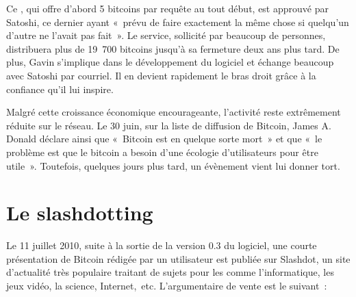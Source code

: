 Ce , qui offre d'abord 5 bitcoins par requête au tout début, est approuvé par Satoshi, ce dernier ayant «~prévu de faire exactement la même chose si quelqu'un d'autre ne l'avait pas fait~». Le service, sollicité par beaucoup de personnes, distribuera plus de 19~700 bitcoins jusqu'à sa fermeture deux ans plus tard. %
De plus, Gavin s'implique dans le développement du logiciel et échange beaucoup avec Satoshi par courriel. Il en devient rapidement le bras droit grâce à la confiance qu'il lui inspire.

Malgré cette croissance économique encourageante, l'activité reste extrêmement réduite sur le réseau. Le 30 juin, sur la liste de diffusion de Bitcoin, James A. Donald déclare ainsi que «~Bitcoin est en quelque sorte mort~» et que «~le problème est que le bitcoin a besoin d'une écologie d'utilisateurs pour être utile~». Toutefois, quelques jours plus tard, un évènement vient lui donner tort.

\section*{Le slashdotting}

Le 11 juillet 2010, suite à la sortie de la version 0.3 du logiciel, une courte présentation de Bitcoin rédigée par un utilisateur est publiée sur Slashdot, un site d'actualité très populaire traitant de sujets pour les  comme l'informatique, les jeux vidéo, la science, Internet,~etc. L'argumentaire de vente est le suivant~:

